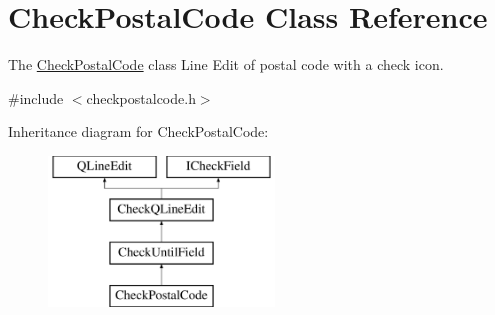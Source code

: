 \hypertarget{classCheckPostalCode}{\section{Check\-Postal\-Code Class Reference}
\label{classCheckPostalCode}
}


The \hyperlink{classCheckPostalCode}{Check\-Postal\-Code} class Line Edit of postal code with a check icon.  




{\ttfamily \#include $<$checkpostalcode.\-h$>$}

Inheritance diagram for Check\-Postal\-Code\-:\begin{figure}[H]
\begin{center}
\leavevmode
\includegraphics[height=4.000000cm]{dc/d63/classCheckPostalCode}
\end{center}
\end{figure}
